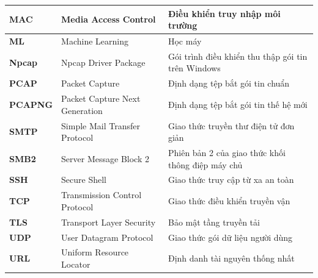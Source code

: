 \documentclass[../DoAn.tex]{subfiles}
\begin{document}
\begin{longtable}{l p{6cm} p{7cm}}
\textbf{MAC} & Media Access Control & Điều khiển truy nhập môi trường \\ \hline
\textbf{ML} & Machine Learning & Học máy \\ \hline
\textbf{Npcap} & Npcap Driver Package & Gói trình điều khiển thu thập gói tin trên Windows \\ \hline
\textbf{PCAP} & Packet Capture & Định dạng tệp bắt gói tin chuẩn \\ \hline
\textbf{PCAPNG} & Packet Capture Next Generation & Định dạng tệp bắt gói tin thế hệ mới \\ \hline
\textbf{SMTP} & Simple Mail Transfer Protocol & Giao thức truyền thư điện tử đơn giản \\ \hline
\textbf{SMB2} & Server Message Block 2 & Phiên bản 2 của giao thức khối thông điệp máy chủ \\ \hline
\textbf{SSH} & Secure Shell & Giao thức truy cập từ xa an toàn \\ \hline
\textbf{TCP} & Transmission Control Protocol & Giao thức điều khiển truyền vận \\ \hline
\textbf{TLS} & Transport Layer Security & Bảo mật tầng truyền tải \\ \hline
\textbf{UDP} & User Datagram Protocol & Giao thức gói dữ liệu người dùng \\ \hline
\textbf{URL} & Uniform Resource Locator & Định danh tài nguyên thống nhất \\ \hline
\end{longtable}
\end{document}
